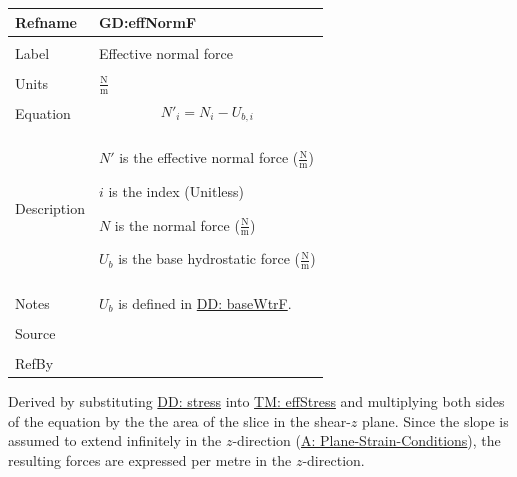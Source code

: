 \documentclass[12pt]{article}
\begin{document}
\noindent \begin{minipage}{\textwidth}
\begin{tabular}{p{} p{}}
\toprule \textbf{Refname} & \textbf{GD:effNormF}
\label{GD:effNormF}
\\ \midrule \\
Label & Effective normal force
        \\ \midrule \\
        Units & $\frac{\text{N}}{\text{m}}$
                \\ \midrule \\
                Equation & \begin{displaymath}
                           {N'}_{i}=N_{i}-{U_{b,i}}
                           \end{displaymath}
                           \\ \midrule \\
                           Description & \begin{symbDescription}
                                         \item{$N'$ is the effective normal force ($\frac{\text{N}}{\text{m}}$)}
                                         \item{$i$ is the index (Unitless)}
                                         \item{$N$ is the normal force ($\frac{\text{N}}{\text{m}}$)}
                                         \item{${U_{b}}$ is the base hydrostatic force ($\frac{\text{N}}{\text{m}}$)}
                                         \end{symbDescription}
                                         \\ \midrule \\
                                         Notes & ${U_{b}}$ is defined in \hyperref[DD:baseWtrF]{DD: baseWtrF}.
                                                 \\ \midrule \\
                                                 Source & \cite{chen2005}
                                                          \\ \midrule \\
                                                          RefBy & 
\\ \bottomrule \end{tabular}
\end{minipage}
Derived by substituting \hyperref[DD:stress]{DD: stress} into \hyperref[TM:effStress]{TM: effStress} and multiplying both sides of the equation by the the area of the slice in the shear-$z$ plane. Since the slope is assumed to extend infinitely in the $z$-direction (\hyperref[assumpPSC]{A: Plane-Strain-Conditions}), the resulting forces are expressed per metre in the $z$-direction.
\par~
\end{document}
